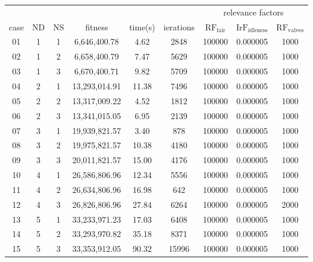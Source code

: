 \documentclass{singlecol}
\theoremstyle{TH}{
\newtheorem{lemma}{Lemma}
\newtheorem{theorem}[lemma]{Theorem}
\newtheorem{corrolary}[lemma]{Corrolary}
\newtheorem{conjecture}[lemma]{Conjecture}
\newtheorem{proposition}[lemma]{Proposition}
\newtheorem{claim}[lemma]{Claim}
\newtheorem{stheorem}[lemma]{Wrong Theorem}
\newtheorem{algorithm}{Algorithm}
}
\theoremstyle{THrm}{
\newtheorem{definition}{Definition}[section]
\newtheorem{question}{Question}[section]
\newtheorem{remark}{Remark}
\newtheorem{scheme}{Scheme}
}
\theoremstyle{THhit}{
\newtheorem{case}{Case}[section]
}
\begin{document}
\begin{table}[t]
\begin{center}
\begin{small}
	\begin{tabular}{ c c c c c c c c c } 
	
         &    &    &                &           &           &   \multicolumn{3}{c}{relevance factors}  \\      
	case & ND & NS &    fitness     &  time(s)  & ierations &  $\mathrm{RF_{fair}}$   & $\mathrm{IrF_{idleness}}$ & $\mathrm{RF_{valves}}$      \\
	 01  &  1 & 1  &  6,646,400.78  &    4.62   &   2848    &  100000   &    0.000005   & 1000 \\
	 02  &  1 & 2  &  6,658,400.79  &    7.47   &   5629    &  100000   &    0.000005   & 1000 \\
	 03  &  1 & 3  &  6,670,400.71  &    9.82   &   5709    &  100000   &    0.000005   & 1000 \\
	 04  &  2 & 1  & 13,293,014.91  &   11.38   &   7496    &  100000   &    0.000005   & 1000 \\
	 05  &  2 & 2  & 13,317,009.22  &    4.52   &   1812    &  100000   &    0.000005   & 1000 \\
	 06  &  2 & 3  & 13,341,015.05  &    6.95   &   2139    &  100000   &    0.000005   & 1000 \\
	 07  &  3 & 1  & 19,939,821.57  &    3.40   &    878    &  100000   &    0.000005   & 1000 \\
	 08  &  3 & 2  & 19,975,821.57  &   10.38   &   4180    &  100000   &    0.000005   & 1000 \\
	 09  &  3 & 3  & 20,011,821.57  &   15.00   &   4176    &  100000   &    0.000005   & 1000 \\
	 10  &  4 & 1  & 26,586,806.96  &   12.34   &   5556    &  100000   &    0.000005   & 1000 \\
	 11  &  4 & 2  & 26,634,806.96  &   16.98   &    642    &  100000   &    0.000005   & 1000 \\
	 12  &  4 & 3  & 26,826,806.96  &   27.84   &   6264    &  100000   &    0.000005   & 2000 \\
	 13  &  5 & 1  & 33,233,971.23  &   17.03   &   6408    &  100000   &    0.000005   & 1000 \\
	 14  &  5 & 2  & 33,293,970.82  &   35.18   &   8371    &  100000   &    0.000005   & 1000 \\
	 15  &  5 & 3  & 33,353,912.05  &   90.32   &  15996    &  100000   &    0.000005   & 1000 \\

\end{tabular}
\end{small}
\end{center}
\end{table}
\end{document}
